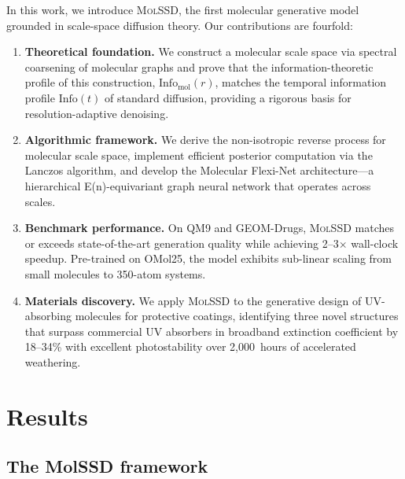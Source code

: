 \documentclass[11pt]{article}
\newcommand{\molssd}{\textsc{MolSSD}}
\newcommand{\info}{\mathrm{Info}}
\begin{document}
In this work, we introduce \molssd{}, the first molecular generative model grounded in scale-space diffusion theory. Our contributions are fourfold:
\begin{enumerate}
    \item \textbf{Theoretical foundation.} We construct a molecular scale space via spectral coarsening of molecular graphs and prove that the information-theoretic profile of this construction, $\info_{\text{mol}}(r)$, matches the temporal information profile $\info(t)$ of standard diffusion, providing a rigorous basis for resolution-adaptive denoising.

    \item \textbf{Algorithmic framework.} We derive the non-isotropic reverse process for molecular scale space, implement efficient posterior computation via the Lanczos algorithm, and develop the Molecular Flexi-Net architecture---a hierarchical E(n)-equivariant graph neural network that operates across scales.

    \item \textbf{Benchmark performance.} On QM9 and GEOM-Drugs, \molssd{} matches or exceeds state-of-the-art generation quality while achieving 2--3$\times$ wall-clock speedup. Pre-trained on OMol25, the model exhibits sub-linear scaling from small molecules to 350-atom systems.

    \item \textbf{Materials discovery.} We apply \molssd{} to the generative design of UV-absorbing molecules for protective coatings, identifying three novel structures that surpass commercial UV absorbers in broadband extinction coefficient by 18--34\% with excellent photostability over 2{,}000~hours of accelerated weathering.
\end{enumerate}


\section*{Results}

\subsection*{The MolSSD framework}
\end{document}
